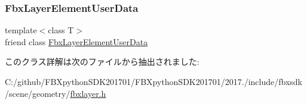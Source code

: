 \subsubsection{\texorpdfstring{Fbx\+Layer\+Element\+User\+Data}{FbxLayerElementUserData}}
{\footnotesize\ttfamily template$<$class T$>$ \\
friend class \hyperlink{class_fbx_layer_element_user_data}{Fbx\+Layer\+Element\+User\+Data}\hspace{0.3cm}{\ttfamily [friend]}}



このクラス詳解は次のファイルから抽出されました\+:\begin{DoxyCompactItemize}
\item 
C\+:/github/\+F\+B\+Xpython\+S\+D\+K201701/\+F\+B\+Xpython\+S\+D\+K201701/2017./include/fbxsdk/scene/geometry/\hyperlink{fbxlayer_8h}{fbxlayer.\+h}\end{DoxyCompactItemize}
